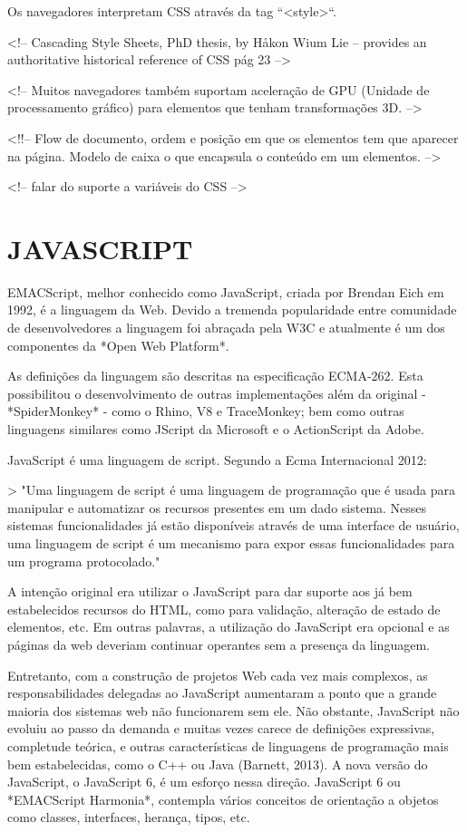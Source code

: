 \documentclass[11pt,a4paper]{article}
\begin{document}
Os navegadores interpretam CSS através da tag ``<style>``.

<!-- Cascading Style Sheets, PhD thesis, by Håkon Wium Lie – provides
an authoritative historical reference of CSS pág 23 -->

<!-- Muitos navegadores também suportam aceleração de GPU (Unidade de
processamento gráfico) para elementos que tenham transformações 3D.
-->

<!!-- Flow de documento, ordem e posição em que os elementos tem que
aparecer na página. Modelo de caixa o que encapsula o conteúdo em um
elementos. -->

<!-- falar do suporte a variáveis do CSS -->


\section{JAVASCRIPT}

EMACScript, melhor conhecido como JavaScript, criada por Brendan Eich
em 1992, é a linguagem da Web. Devido a tremenda popularidade entre
comunidade de desenvolvedores a linguagem foi abraçada pela W3C e
atualmente é um dos componentes da *Open Web Platform*.

As definições da linguagem são descritas na especificação ECMA-262.
Esta possibilitou o desenvolvimento de outras implementações além da
original - *SpiderMonkey* - como o Rhino, V8 e TraceMonkey; bem como
outras linguagens similares como JScript da Microsoft e o ActionScript
da Adobe.

JavaScript é uma linguagem de script. Segundo a Ecma Internacional
2012:

> "Uma linguagem de script é uma linguagem de programação que é
usada para manipular e automatizar os recursos presentes em um dado
sistema. Nesses sistemas funcionalidades já estão disponíveis
através de uma interface de usuário, uma linguagem de script é
um mecanismo para expor essas funcionalidades para um programa
protocolado."

A intenção original era utilizar o JavaScript para dar suporte aos já
bem estabelecidos recursos do HTML, como para validação, alteração
de estado de elementos, etc. Em outras palavras, a utilização do
JavaScript era opcional e as páginas da web deveriam continuar
operantes sem a presença da linguagem.

Entretanto, com a construção de projetos Web cada vez mais complexos,
as responsabilidades delegadas ao JavaScript aumentaram a ponto que a
grande maioria dos sistemas web não funcionarem sem ele. Não obstante,
JavaScript não evoluiu ao passo da demanda e muitas vezes carece de
definições expressivas, completude teórica, e outras características
de linguagens de programação mais bem estabelecidas, como o C++ ou
Java (Barnett, 2013). A nova versão do JavaScript, o JavaScript 6, é
um esforço nessa direção. JavaScript 6 ou *EMACScript Harmonia*,
contempla vários conceitos de orientação a objetos como classes,
interfaces, herança, tipos, etc.
\end{document}
